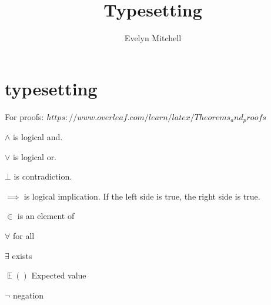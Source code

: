 \documentclass[]{scrartcl}
\title{Typesetting}
\author{Evelyn Mitchell}
\DeclareMathOperator{\EX}{\mathbb{E}}%
\begin{document}
\maketitle

\begin{abstract}

\end{abstract}

\section{typesetting}

For proofs: $https://www.overleaf.com/learn/latex/Theorems_and_proofs$

$\land$ is logical and.

$\lor$ is logical or.

$\bot$ is contradiction.

$\implies$ is logical implication. If the left side is true, the right side is true.

$\in$ is an element of

$\forall$ for all

$\exists$ exists

$\EX()$ Expected value

$\neg$ negation
\end{document}
